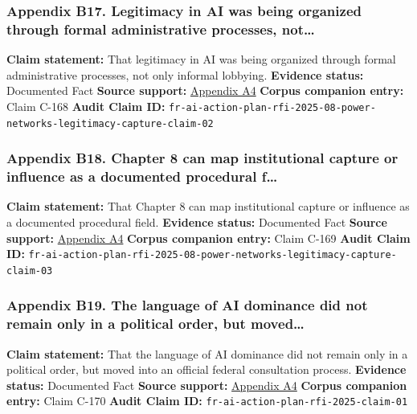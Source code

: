\documentclass[
  american,
  11pt,
  letterpaper,
]{article}
\begin{document}
\subsubsection{Appendix B17. Legitimacy in AI was being organized
through formal administrative processes,
not\ldots{}}\label{appendix-b17-legitimacy-in-ai-was-being-organized-through-formal-administrative-processes-not}

\textbf{Claim statement:} That legitimacy in AI was being organized
through formal administrative processes, not only informal lobbying.
\textbf{Evidence status:} Documented Fact \textbf{Source support:}
\hyperref[appendix-a4-request-for-information-on-the-development-of-an-artificial-intelligence-ai-action-plan]{Appendix
A4} \textbf{Corpus companion entry:} Claim C-168 \textbf{Audit Claim
ID:}
\texttt{fr-ai-action-plan-rfi-2025-08-power-networks-legitimacy-capture-claim-02}

\subsubsection{Appendix B18. Chapter 8 can map institutional capture or
influence as a documented procedural
f\ldots{}}\label{appendix-b18-chapter-8-can-map-institutional-capture-or-influence-as-a-documented-procedural-f}

\textbf{Claim statement:} That Chapter 8 can map institutional capture
or influence as a documented procedural field. \textbf{Evidence status:}
Documented Fact \textbf{Source support:}
\hyperref[appendix-a4-request-for-information-on-the-development-of-an-artificial-intelligence-ai-action-plan]{Appendix
A4} \textbf{Corpus companion entry:} Claim C-169 \textbf{Audit Claim
ID:}
\texttt{fr-ai-action-plan-rfi-2025-08-power-networks-legitimacy-capture-claim-03}

\subsubsection{Appendix B19. The language of AI dominance did not remain
only in a political order, but
moved\ldots{}}\label{appendix-b19-the-language-of-ai-dominance-did-not-remain-only-in-a-political-order-but-moved}

\textbf{Claim statement:} That the language of AI dominance did not
remain only in a political order, but moved into an official federal
consultation process. \textbf{Evidence status:} Documented Fact
\textbf{Source support:}
\hyperref[appendix-a4-request-for-information-on-the-development-of-an-artificial-intelligence-ai-action-plan]{Appendix
A4} \textbf{Corpus companion entry:} Claim C-170 \textbf{Audit Claim
ID:} \texttt{fr-ai-action-plan-rfi-2025-claim-01}
\end{document}
